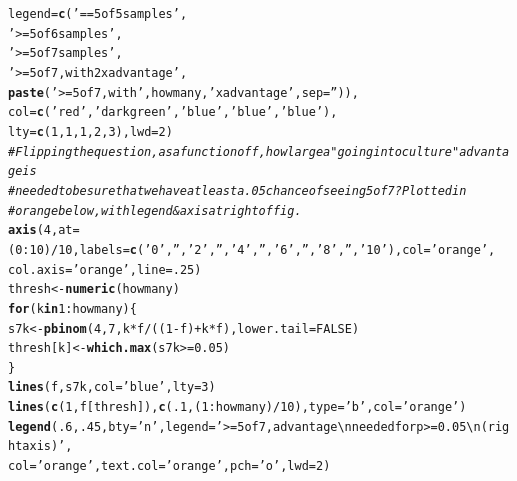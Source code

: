 \documentclass{article}\usepackage[]{graphicx}\usepackage[]{color}
\makeatletter
\newcommand{\hlnum}[1]{\textcolor[rgb]{0.686,0.059,0.569}{#1}}%
\newcommand{\hlstr}[1]{\textcolor[rgb]{0.192,0.494,0.8}{#1}}%
\newcommand{\hlcom}[1]{\textcolor[rgb]{0.678,0.584,0.686}{\textit{#1}}}%
\newcommand{\hlopt}[1]{\textcolor[rgb]{0,0,0}{#1}}%
\newcommand{\hlstd}[1]{\textcolor[rgb]{0.345,0.345,0.345}{#1}}%
\newcommand{\hlkwa}[1]{\textcolor[rgb]{0.161,0.373,0.58}{\textbf{#1}}}%
\newcommand{\hlkwb}[1]{\textcolor[rgb]{0.69,0.353,0.396}{#1}}%
\newcommand{\hlkwc}[1]{\textcolor[rgb]{0.333,0.667,0.333}{#1}}%
\newcommand{\hlkwd}[1]{\textcolor[rgb]{0.737,0.353,0.396}{\textbf{#1}}}%
\newenvironment{kframe}{%
 \def\at@end@of@kframe{}%
 \ifinner\ifhmode%
  \def\at@end@of@kframe{\end{minipage}}%
  \begin{minipage}{\columnwidth}%
 \fi\fi%
 \def\FrameCommand##1{\hskip\@totalleftmargin \hskip-\fboxsep
 \colorbox{shadecolor}{##1}\hskip-\fboxsep
     \hskip-\linewidth \hskip-\@totalleftmargin \hskip\columnwidth}%
 \MakeFramed {\advance\hsize-\width
   \@totalleftmargin\z@ \linewidth\hsize
   \@setminipage}}%
 {\par\unskip\endMakeFramed%
 \at@end@of@kframe}
\newenvironment{knitrout}{}{} %
\makeatother
\begin{document}
\begin{knitrout}
\begin{kframe}
\begin{alltt}
       \hlkwc{legend}\hlstd{=}\hlkwd{c}\hlstd{(}\hlstr{'== 5 of 5 samples'}\hlstd{,}
                \hlstr{'>= 5 of 6 samples'}\hlstd{,}
                \hlstr{'>= 5 of 7 samples'}\hlstd{,}
                \hlstr{'>= 5 of 7, with 2x advantage'}\hlstd{,}
                \hlkwd{paste}\hlstd{(}\hlstr{'>= 5 of 7, with '}\hlstd{,howmany,}\hlstr{'x advantage'}\hlstd{,}\hlkwc{sep}\hlstd{=}\hlstr{''}\hlstd{)),}
       \hlkwc{col}\hlstd{=}\hlkwd{c}\hlstd{(}\hlstr{'red'}\hlstd{,}\hlstr{'darkgreen'}\hlstd{,}\hlstr{'blue'}\hlstd{,}\hlstr{'blue'}\hlstd{,} \hlstr{'blue'}\hlstd{),}
       \hlkwc{lty}\hlstd{=}\hlkwd{c}\hlstd{(}    \hlnum{1}\hlstd{,}          \hlnum{1}\hlstd{,}     \hlnum{1}\hlstd{,}     \hlnum{2}\hlstd{,}      \hlnum{3}\hlstd{),} \hlkwc{lwd}\hlstd{=}\hlnum{2}\hlstd{)}
\hlcom{# Flipping the question, as a function of f, how large a "going into culture" advantage is}
\hlcom{# needed to be sure that we have at least a .05 chance of seeing 5 of 7?  Plotted in}
\hlcom{# orange below, with legend & axis at right of fig.}
\hlkwd{axis}\hlstd{(}\hlnum{4}\hlstd{,} \hlkwc{at}\hlstd{=(}\hlnum{0}\hlopt{:}\hlnum{10}\hlstd{)}\hlopt{/}\hlnum{10}\hlstd{,} \hlkwc{labels}\hlstd{=}\hlkwd{c}\hlstd{(}\hlstr{'0'}\hlstd{,}\hlstr{''}\hlstd{,}\hlstr{'2'}\hlstd{,}\hlstr{''}\hlstd{,}\hlstr{'4'}\hlstd{,}\hlstr{''}\hlstd{,}\hlstr{'6'}\hlstd{,}\hlstr{''}\hlstd{,}\hlstr{'8'}\hlstd{,}\hlstr{''}\hlstd{,}\hlstr{'10'}\hlstd{),} \hlkwc{col}\hlstd{=}\hlstr{'orange'}\hlstd{,}
     \hlkwc{col.axis}\hlstd{=}\hlstr{'orange'}\hlstd{,} \hlkwc{line}\hlstd{=}\hlnum{.25}\hlstd{)}
\hlstd{thresh} \hlkwb{<-} \hlkwd{numeric}\hlstd{(howmany)}
\hlkwa{for}\hlstd{(k} \hlkwa{in} \hlnum{1}\hlopt{:}\hlstd{howmany)\{}
  \hlstd{s7k} \hlkwb{<-} \hlkwd{pbinom}\hlstd{(}\hlnum{4}\hlstd{,} \hlnum{7}\hlstd{, k}\hlopt{*}\hlstd{f}\hlopt{/}\hlstd{((}\hlnum{1}\hlopt{-}\hlstd{f)}\hlopt{+}\hlstd{k}\hlopt{*}\hlstd{f),} \hlkwc{lower.tail}\hlstd{=}\hlnum{FALSE}\hlstd{)}
  \hlstd{thresh[k]} \hlkwb{<-} \hlkwd{which.max}\hlstd{(s7k} \hlopt{>=} \hlnum{0.05}\hlstd{)}
\hlstd{\}}
\hlkwd{lines}\hlstd{(f, s7k,} \hlkwc{col}\hlstd{=}\hlstr{'blue'}\hlstd{,} \hlkwc{lty}\hlstd{=}\hlnum{3}\hlstd{)}
\hlkwd{lines}\hlstd{(}\hlkwd{c}\hlstd{(}\hlnum{1}\hlstd{,f[thresh]),} \hlkwd{c}\hlstd{(}\hlnum{.1}\hlstd{, (}\hlnum{1}\hlopt{:}\hlstd{howmany)}\hlopt{/}\hlnum{10}\hlstd{),} \hlkwc{type}\hlstd{=}\hlstr{'b'}\hlstd{,} \hlkwc{col}\hlstd{=}\hlstr{'orange'}\hlstd{)}
\hlkwd{legend}\hlstd{(}\hlnum{.6}\hlstd{,} \hlnum{.45}\hlstd{,} \hlkwc{bty}\hlstd{=}\hlstr{'n'}\hlstd{,} \hlkwc{legend}\hlstd{=}\hlstr{'>= 5 of 7, advantage\textbackslash{}nneeded for p>=0.05\textbackslash{}n(right axis)'}\hlstd{,}
       \hlkwc{col}\hlstd{=}\hlstr{'orange'}\hlstd{,} \hlkwc{text.col}\hlstd{=}\hlstr{'orange'}\hlstd{,} \hlkwc{pch}\hlstd{=}\hlstr{'o'}\hlstd{,} \hlkwc{lwd}\hlstd{=}\hlnum{2}\hlstd{)}
\end{alltt}
\end{kframe}


\end{knitrout}
\end{document}
